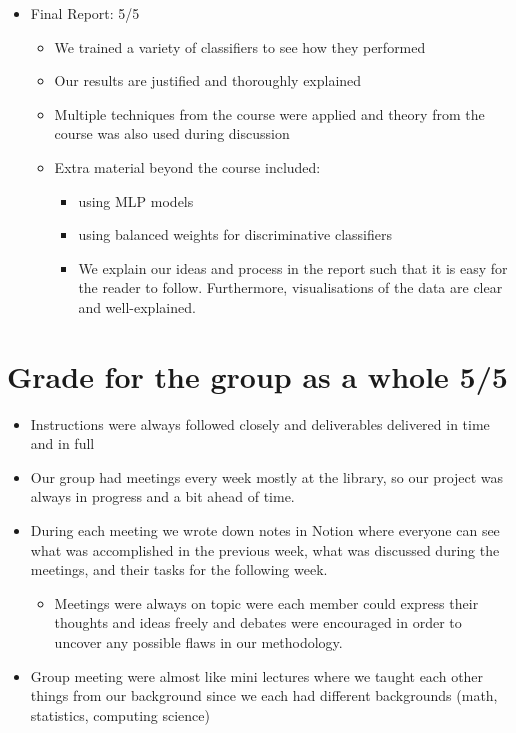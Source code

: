 \begin{itemize}
\item Final Report: 5/5
\begin{itemize}
    \item We trained a variety of classifiers to see how they performed
    \item Our results are justified and thoroughly explained
    \item Multiple techniques from the course were applied and theory from the course was also used during discussion
    \item Extra material beyond the course included:
    \begin{itemize}
      \item using MLP models
      \item using balanced weights for discriminative classifiers
      \item We explain our ideas and process in the report such that it is easy for the reader to follow. Furthermore, visualisations of the data are clear and well-explained.
    \end{itemize}
  \end{itemize}
\end{itemize}

\section{Grade for the group as a whole 5/5}

\begin{itemize}
\item Instructions were always followed closely and deliverables delivered in time and in full
\item Our group had meetings every week mostly at the library, so our project was always in progress and a bit ahead of time.
\item During each meeting we wrote down notes in Notion where everyone can see what was accomplished in the previous week, what was discussed during the meetings, and their tasks for the following week.
    \begin{itemize}
    \item Meetings were always on topic were each member could express their thoughts and ideas freely and debates were encouraged in order to uncover any possible flaws in our methodology.
    \end{itemize}
\item Group meeting were almost like mini lectures where we taught each other things from our background since we each had different backgrounds (math, statistics, computing science)
\end{itemize}
